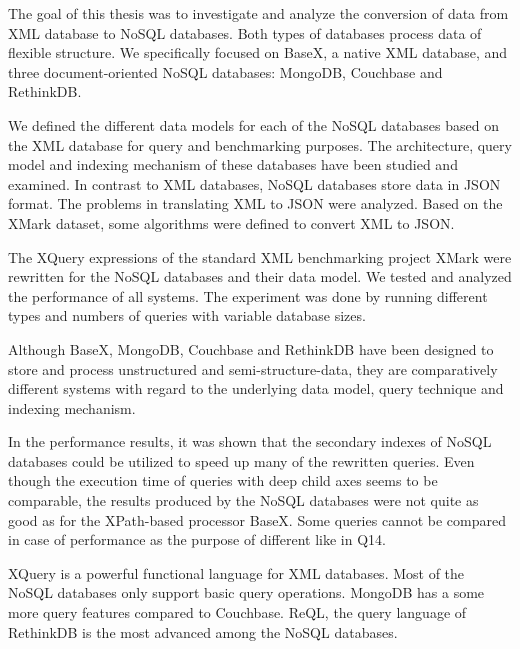 The goal of this thesis was to investigate and analyze the conversion of data from XML database to NoSQL databases. Both types of databases process data of flexible structure. We specifically focused on BaseX, a native XML database, and three document-oriented NoSQL databases: MongoDB, Couchbase and RethinkDB. 

We defined the different data models for each of the NoSQL databases based on the XML database for query and benchmarking purposes. The architecture, query model and indexing mechanism of these databases have been studied and examined.  In contrast to XML databases, NoSQL databases store data in JSON format. The problems in translating XML to JSON were analyzed. Based on the XMark dataset, some algorithms were defined to convert XML to JSON.

The XQuery expressions of the standard XML benchmarking project XMark were rewritten for the NoSQL databases and their data model. We tested and analyzed the performance of all systems. The experiment was done by running different types and numbers of queries with variable database sizes.
\par
Although BaseX, MongoDB, Couchbase and RethinkDB have been designed to store and process unstructured and semi-structure-data, they are comparatively different systems with regard to the underlying data model, query technique and indexing mechanism.

In the performance results, it was shown that the secondary indexes of NoSQL databases could be utilized to speed up many of the rewritten queries. Even though the execution time of queries with deep child axes seems to be comparable, the results produced by the NoSQL databases were not quite as good as for the XPath-based processor BaseX. Some queries cannot be compared in case of performance as the purpose of different like in Q14.

XQuery is a powerful functional language for XML databases. Most of the NoSQL databases only support basic query operations. MongoDB has a some more query features compared to Couchbase. ReQL, the query language of RethinkDB is the most advanced among the NoSQL databases.

\par

